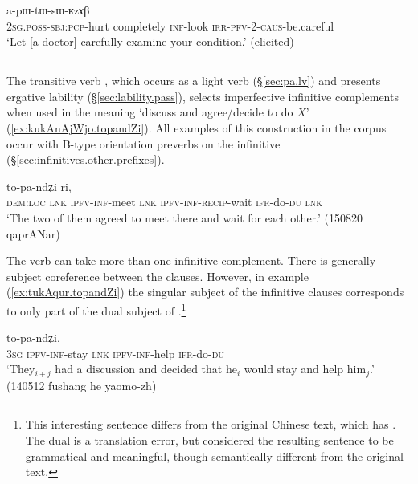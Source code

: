 \begin{exe} 
\ex \label{ex:kArtoR.apWtWsWRzAB}
 a-pɯ-tɯ-sɯ-ʁzɤβ \\
\textsc{2sg}.\textsc{poss}-\textsc{sbj}:\textsc{pcp}-hurt completely \textsc{inf}-look \textsc{irr}-\textsc{pfv}-2-\textsc{caus}-be.careful \\
\glt `Let [a doctor] carefully examine your condition.' (elicited)
\end{exe} 


\subsection{} \label{sec:pa.complements}

The transitive verb , which occurs as a light verb (§\ref{sec:pa.lv}) and presents ergative lability (§\ref{sec:lability.pass}), selects imperfective infinitive complements when used in the meaning `discuss and agree/decide to do $X$' (\ref{ex:kukAnAjWjo.topandZi}). All examples of this construction in the corpus occur with B-type orientation preverbs on the infinitive (§\ref{sec:infinitives.other.prefixes}). 

\begin{exe}
\ex \label{ex:kukAnAjWjo.topandZi}
 to-pa-ndʑi ri, \\
  \textsc{dem}:\textsc{loc} \textsc{lnk} \textsc{ipfv}-\textsc{inf}-meet \textsc{lnk} \textsc{ipfv}-\textsc{inf}-\textsc{recip}-wait \textsc{ifr}-do-\textsc{du} \textsc{lnk} \\
\glt `The two of them agreed to meet there and wait for each other.' (150820 qaprANar)
 \end{exe}
 
The verb  can take more than one infinitive complement. There is generally subject coreference between the clauses. However, in example (\ref{ex:tukAqur.topandZi}) the singular subject of the infinitive clauses corresponds to only part of the dual subject of .\footnote{This interesting sentence differs from the original Chinese text, which has . The dual  is a translation error, but  considered the resulting sentence to be grammatical and meaningful, though semantically different from the original text. }

\begin{exe}
\ex \label{ex:tukAqur.topandZi}
 to-pa-ndʑi. \\
\textsc{3sg} \textsc{ipfv}-\textsc{inf}-stay \textsc{lnk} \textsc{ipfv}-\textsc{inf}-help \textsc{ifr}-do-\textsc{du} \\
\glt `They$_{i+j}$ had a discussion and decided that he$_i$ would stay and help him$_j$.' (140512 fushang he yaomo-zh)
\end{exe}

